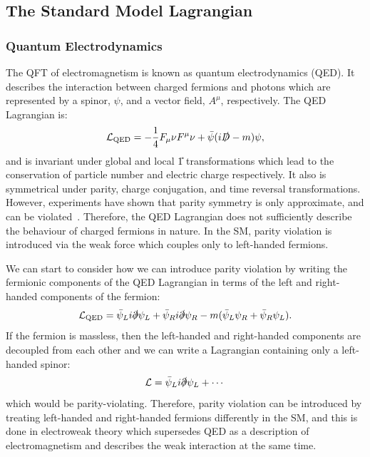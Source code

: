 \subsection{The Standard Model Lagrangian}\label{sec:sm_lagrangian}
\subsubsection{Quantum Electrodynamics}
The QFT of electromagnetism is known as quantum electrodynamics (QED). It describes the interaction between charged fermions and photons which are represented by a spinor, $\psi$, and a vector field, $A^\mu$, respectively. The QED Lagrangian is:
\begin{equation}
  \mathcal{L}_\mathrm{QED} = -\frac{1}{4} F_\mu\nu F^\mu\nu +  \bar{\psi} (i \slashed{D} - m)\psi,
\end{equation}
and is invariant under global and local \U{1} transformations which lead to the conservation of particle number and electric charge respectively. It also is symmetrical under parity, charge conjugation, and time reversal transformations. However, experiments have shown that parity symmetry is only approximate, and can be violated~\cite{Wu:1957my}. Therefore, the QED Lagrangian does not sufficiently describe the behaviour of charged fermions in nature. In the SM, parity violation is introduced via the weak force which couples only to left-handed fermions.

We can start to consider how we can introduce parity violation by writing the fermionic components of the QED Lagrangian in terms of the left and right-handed components of the fermion:
\begin{equation}
  \mathcal{L}_\mathrm{QED} = \bar{\psi}_L i \slashed{\partial} \psi_L + \bar{\psi}_R i \slashed{\partial} \psi_R - m (\bar{\psi}_L \psi_R + \bar{\psi}_R \psi_L) .
\end{equation}
If the fermion is massless, then the left-handed and right-handed components are decoupled from each other and we can write a Lagrangian containing only a left-handed spinor:
\begin{equation}
  \mathcal{L} = \bar{\psi}_L i \slashed{\partial} \psi_L + \cdots
\end{equation}
which would be parity-violating. Therefore, parity violation can be introduced by treating left-handed and right-handed fermions differently in the SM, and this is done in electroweak theory which supersedes QED as a description of electromagnetism and describes the weak interaction at the same time.

